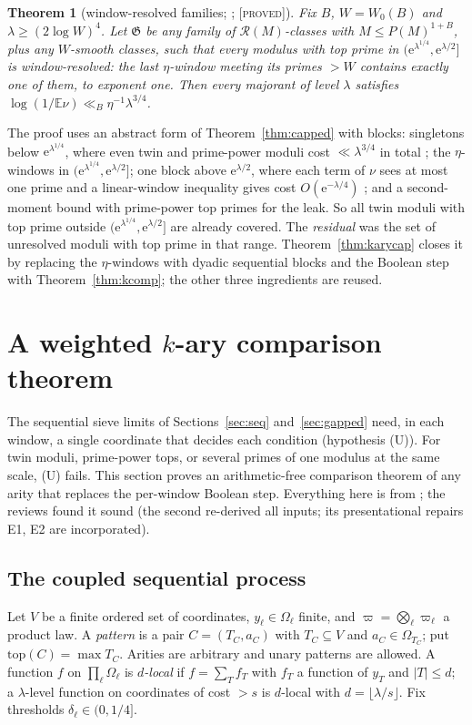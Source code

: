 \documentclass[10pt,reqno]{amsart}
\newtheorem{theorem}{Theorem}[section]
\theoremstyle{definition}
\theoremstyle{remark}
\newcommand{\cR}{\mathscr R}
\newcommand{\cG}{\mathfrak G}
\newcommand{\E}{\mathbb E}
\newcommand{\e}{\mathrm e}
\newcommand{\lab}[1]{\textup{[\textsc{#1}]}}
\begin{document}
\begin{theorem}[window-resolved families; {\cite[Thm~4.4]{TW}}; \lab{proved}]\label{thm:resolved}
Fix $B$, $W=W_0(B)$ and $\lambda\geq(2\log W)^4$.  Let $\cG$ be any family of
$\cR(M)$-classes with $M\leq P(M)^{1+B}$, plus any $W$-smooth classes,
such that every modulus with top prime in $(\e^{\lambda^{1/4}},\e^{\lambda/2}]$
is window-resolved: the last $\eta$-window meeting its primes $>W$
contains exactly one of them, to exponent one.  Then every majorant of
level $\lambda$ satisfies $\log(1/\E\nu)\ll_B\eta^{-1}\lambda^{3/4}$.
\end{theorem}
The proof \cite[\S4]{TW} uses an abstract form of
Theorem~\ref{thm:capped} with blocks: singletons below
$\e^{\lambda^{1/4}}$, where even twin and prime-power moduli cost
$\ll\lambda^{3/4}$ in total \cite[Prop.~4.1]{TW}; the $\eta$-windows in
$(\e^{\lambda^{1/4}},\e^{\lambda/2}]$; one block above $\e^{\lambda/2}$, where
each term of $\nu$ sees at most one prime and a linear-window inequality
gives cost $O(\e^{-\lambda/4})$ \cite[Lemma~4.2, Cor.~4.3]{TW}; and a
second-moment bound with prime-power top primes \cite[Lemma~4.0]{TW} for
the leak.  So all twin moduli with top prime outside
$(\e^{\lambda^{1/4}},\e^{\lambda/2}]$ are already covered.  The
\emph{residual} was the set of unresolved moduli with top prime in that
range.  Theorem~\ref{thm:karycap} closes it by replacing the
$\eta$-windows with dyadic sequential blocks and the Boolean step with
Theorem~\ref{thm:kcomp}; the other three ingredients are reused.

\section{A weighted \texorpdfstring{$k$}{k}-ary comparison theorem}\label{sec:kary}

The sequential sieve limits of Sections~\ref{sec:seq} and~\ref{sec:gapped}
need, in each window, a single coordinate that decides each condition
(hypothesis (U)).  For twin moduli, prime-power tops, or several primes of
one modulus at the same scale, (U) fails.  This section proves an
arithmetic-free comparison theorem of any arity that replaces the
per-window Boolean step.  Everything here is from \cite[\S\S1--3]{KA}; the
reviews \cite{KArev,KArev2} found it sound (the second re-derived all
inputs; its presentational repairs E1, E2 are incorporated).

\subsection{The coupled sequential process}
Let $V$ be a finite ordered set of coordinates, $y_\ell\in\Omega_\ell$
finite, and $\varpi=\bigotimes_\ell\varpi_\ell$ a product law.  A
\emph{pattern} is a pair $C=(T_C,a_C)$ with $T_C\subseteq V$ and
$a_C\in\Omega_{T_C}$; put $\mathrm{top}(C)=\max T_C$.  Arities are
arbitrary and unary patterns are allowed.  A function $f$ on
$\prod_\ell\Omega_\ell$ is \emph{$d$-local} if $f=\sum_Tf_T$ with $f_T$ a
function of $y_T$ and $|T|\leq d$; a $\lambda$-level function on coordinates
of cost $>s$ is $d$-local with $d=\lfloor\lambda/s\rfloor$.  Fix thresholds
$\delta_\ell\in(0,1/4]$.
\end{document}
